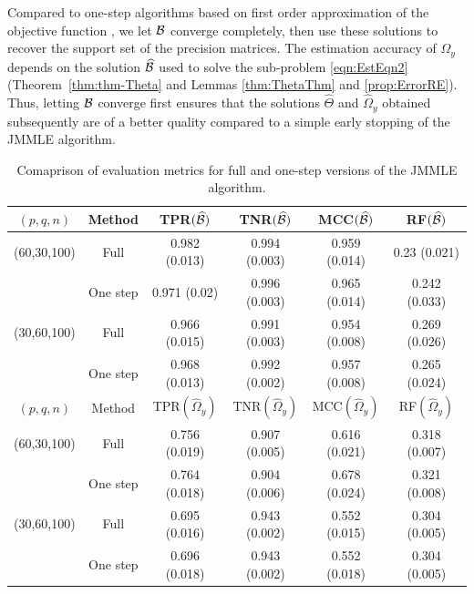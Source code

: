 Compared to one-step algorithms based on first order approximation of the objective function \citep{ZouLi08,Taddy17}, we let ${\cal{B}}$ converge completely, then use these solutions to recover the support set of the precision matrices. The estimation accuracy of $\Omega_y$ depends on the solution $\widehat {{\cal{B}}}$ used to solve the sub-problem \eqref{eqn:EstEqn2} (Theorem~\ref{thm:thm-Theta} and Lemmas \ref{thm:ThetaThm} and \ref{prop:ErrorRE}). Thus, letting ${\cal{B}}$ converge first ensures that the solutions $\widehat \Theta$ and $\widehat \Omega_y$ obtained subsequently are of a better quality compared to a simple early stopping of the JMMLE algorithm.
\begin{table}[t!]
\centering
    \begin{tabular}{cccccc}
    \hline
    $(p,q,n)$     & Method         & TPR$(\widehat {{\cal{B}}})$            & TNR$(\widehat {{\cal{B}}})$            & MCC$(\widehat {{\cal{B}}})$ & RF$(\widehat {{\cal{B}}})$             \\\hline
    (60,30,100) & Full         & 0.982 (0.013) & 0.994 (0.003) & 0.959 (0.014)   & 0.23 (0.021)  \\
    ~           & One step     & 0.971 (0.02)  & 0.996 (0.003) & 0.965 (0.014)   & 0.242 (0.033) \\
    (30,60,100) & Full         & 0.966 (0.015) & 0.991 (0.003) & 0.954 (0.008)   & 0.269 (0.026) \\
    ~           & One step     & 0.968 (0.013) & 0.992 (0.002) & 0.957 (0.008)   & 0.265 (0.024) \\ \hline
    \hline
    $(p,q,n)$     & Method         & TPR$(\widehat \Omega_y)$            & TNR$(\widehat \Omega_y)$            & MCC$(\widehat \Omega_y)$ & RF$(\widehat \Omega_y)$            \\\hline
    (60,30,100) & Full         & 0.756 (0.019) & 0.907 (0.005)  & 0.616 (0.021)   & 0.318 (0.007) \\
    ~           & One step     & 0.764 (0.018) & 0.904 (0.006)  & 0.678 (0.024)   & 0.321 (0.008) \\
    (30,60,100) & Full         & 0.695 (0.016) & 0.943 (0.002)  & 0.552 (0.015)   & 0.304 (0.005) \\
    ~           & One step     & 0.696 (0.018) & 0.943 (0.002)  & 0.552 (0.018)   & 0.304 (0.005) \\\hline
    \end{tabular}
    \caption{Comaprison of evaluation metrics for full and one-step versions of the JMMLE algorithm.}
    \label{table:simtable41}
\end{table}
